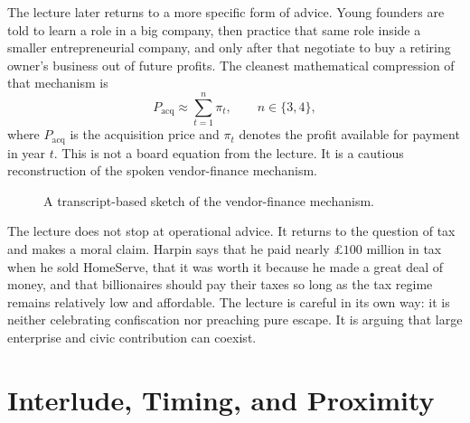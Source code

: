 The lecture later returns to a more specific form of advice. Young founders are told to learn a role in a big company, then practice that same role inside a smaller entrepreneurial company, and only after that negotiate to buy a retiring owner's business out of future profits. The cleanest mathematical compression of that mechanism is
\begin{equation}
P_{\mathrm{acq}} \approx \sum_{t=1}^{n}\pi_t,
\qquad n\in\{3,4\},
\end{equation}
where \(P_{\mathrm{acq}}\) is the acquisition price and \(\pi_t\) denotes the profit available for payment in year \(t\). This is not a board equation from the lecture. It is a cautious reconstruction of the spoken vendor-finance mechanism.

\begin{figure}[h]
\centering
{}
\caption{A transcript-based sketch of the vendor-finance mechanism.}
\end{figure}

The lecture does not stop at operational advice. It returns to the question of tax and makes a moral claim. Harpin says that he paid nearly \(\pounds 100\) million in tax when he sold HomeServe, that it was worth it because he made a great deal of money, and that billionaires should pay their taxes so long as the tax regime remains relatively low and affordable. The lecture is careful in its own way: it is neither celebrating confiscation nor preaching pure escape. It is arguing that large enterprise and civic contribution can coexist.

\section{Interlude, Timing, and Proximity}

